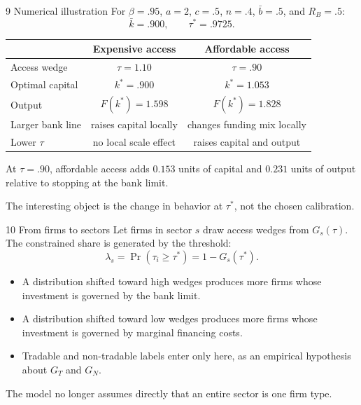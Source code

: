 \documentclass[aspectratio=169,11pt]{beamer}
\newcommand{\Rb}{R_B}
\begin{document}
\begin{frame}{9 \textperiodcentered{} Numerical illustration}
For $\beta=.95$, $a=2$, $c=.5$, $n=.4$, $\bar b=.5$, and $\Rb=.5$:
\[
\bar k=.900,\qquad \tau^*=.9725.
\]

\begin{center}
\small
\begin{tabular}{lcc}
\toprule
 & Expensive access & Affordable access \\
\midrule
Access wedge & $\tau=1.10$ & $\tau=.90$ \\
Optimal capital & $k^*=.900$ & $k^*=1.053$ \\
Output & $F(k^*)=1.598$ & $F(k^*)=1.828$ \\
Larger bank line & raises capital locally & changes funding mix locally \\
Lower $\tau$ & no local scale effect & raises capital and output \\
\bottomrule
\end{tabular}
\end{center}

At $\tau=.90$, affordable access adds $0.153$ units of capital and $0.231$
units of output relative to stopping at the bank limit.

\medskip
The interesting object is the change in behavior at $\tau^*$, not the chosen
calibration.
\end{frame}

\begin{frame}{10 \textperiodcentered{} From firms to sectors}
Let firms in sector $s$ draw access wedges from $G_s(\tau)$. The constrained
share is generated by the threshold:
\[
\lambda_s
=\Pr(\tau_i\ge\tau^*)
=1-G_s(\tau^*).
\]

\begin{itemize}
  \item A distribution shifted toward high wedges produces more firms whose
        investment is governed by the bank limit.
  \item A distribution shifted toward low wedges produces more firms whose
        investment is governed by marginal financing costs.
  \item Tradable and non-tradable labels enter only here, as an empirical
        hypothesis about $G_T$ and $G_N$.
\end{itemize}

\alert{The model no longer assumes directly that an entire sector is one firm type.}
\end{frame}
\end{document}
